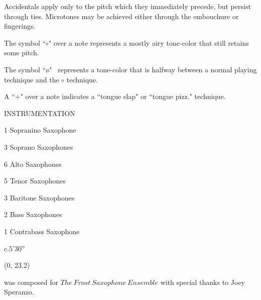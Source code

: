 \documentclass[12pt]{article}
\begin{document}
\begin{center}
Accidentals apply only to the pitch which they immediately precede, but persist through ties. Microtones may be achieved either through the embouchure or fingerings.
\end{center}

\begin{center}
The symbol ``$\circ$" over a note represents a mostly airy tone-color that still retains some pitch.
\end{center}

\begin{center}
The symbol ``\o" \ represents a tone-color that is halfway between a normal playing technique and the $\circ$ technique.
\end{center}

\begin{center}
A ``$+$" over a note indicates a ``tongue slap" or ``tongue pizz." technique.
\end{center}

\vspace*{0.5\baselineskip}

\begin{center}
\huge INSTRUMENTATION
\end{center}
\begin{center}
1 Sopranino Saxophone
\end{center}
\begin{center}
3 Soprano Saxophones
\end{center}
\begin{center}
6 Alto Saxophones
\end{center}
\begin{center}
5 Tenor Saxophones
\end{center}
\begin{center}
3 Baritone Saxophones
\end{center}
\begin{center}
2 Bass Saxophones
\end{center}
\begin{center}
1 Contrabass Saxophone
\end{center}

\vspace*{1\baselineskip}

\begin{center}
c.5'30''
\end{center}

\begin{textblock}{23.7}(0, 23.2)
\begin{center}
 was composed for $The \ Frost \ Saxophone \ Ensemble$ with special thanks to Joey Speranzo.
\end{center}
\end{textblock}
\end{document}
